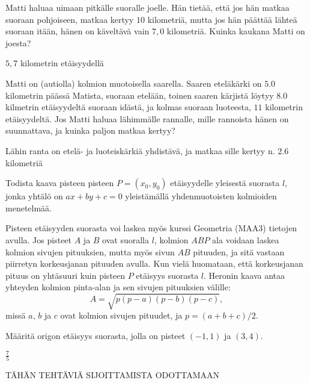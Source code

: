 \begin{tehtavasivu}
\begin{tehtava}
Matti haluaa uimaan pitkälle suoralle joelle. Hän tietää, että jos hän matkaa suoraan pohjoiseen, matkaa kertyy $10$ kilometriä, mutta jos hän päättää lähteä suoraan itään, hänen on käveltävä vain $7,0$ kilometriä. Kuinka kaukana Matti on joesta?
\begin{vastaus}
$5,7$ kilometrin etäisyydellä
\end{vastaus}
\end{tehtava}

\begin{tehtava}
Matti on (autiolla) kolmion muotoisella saarella. Saaren eteläkärki on $5.0$ kilometrin päässä Matista, suoraan etelään, toinen saaren kärjistä löytyy $8.0$ kilmetrin etäisyydeltä suoraan idästä, ja kolmas suoraan luoteesta, $11$ kilometrin etäisyydeltä. Jos Matti haluaa lähimmälle rannalle, mille rannoista hänen on suunnattava, ja kuinka paljon matkaa kertyy?
\begin{vastaus}
Lähin ranta on etelä- ja luoteiskärkiä yhdistävä, ja matkaa sille kertyy n. $2.6$ kilometriä
\end{vastaus}
\end{tehtava}

\begin{tehtava}
  Todista kaava pisteen pisteen $P=(x_0,y_0)$ etäisyydelle yleisestä suorasta $l$, jonka yhtälö on $ax + by +c = 0$ yleistämällä yhdenmuotoisten kolmioiden menetelmää.
  \begin{vastaus}
  \end{vastaus}
\end{tehtava}

\begin{tehtava}
	Pisteen etäisyyden suorasta voi laskea myös kurssi Geometria (MAA3) tietojen avulla. Jos pisteet $A$ ja $B$ ovat suoralla $l$, kolmion $ABP$ ala voidaan laskea kolmion sivujen pituuksien, mutta myös sivun $AB$ pituuden, ja sitä vastaan piirretyn korkeusjanan pituuden avulla. Kun vielä huomataan, että korkeusjanan pituus on yhtäsuuri kuin pisteen $P$ etäisyys suorasta $l$. Heronin kaava antaa yhteyden kolmion pinta-alan ja sen sivujen pituuksien välille:
	\[
	A = \sqrt{p(p-a)(p-b)(p-c)},
	\]
	missä $a$, $b$ ja $c$ ovat kolmion sivujen pituudet, ja $p = (a+b+c)/2$.
	
	Määritä origon etäisyys suorasta, jolla on pisteet $(-1,1)$ ja $(3,4)$.
	\begin{vastaus}
		$\frac{7}{5}$
	\end{vastaus}
\end{tehtava}


TÄHÄN TEHTÄVIÄ SIJOITTAMISTA ODOTTAMAAN

\end{tehtavasivu}
